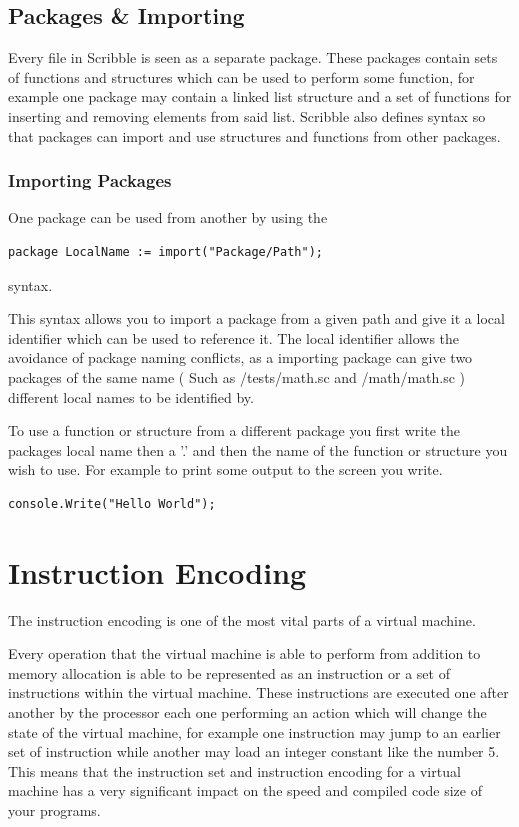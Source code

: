 \documentclass[]{final_report}
\begin{document}
\section{Packages \& Importing}

Every file in Scribble is seen as a separate package. These packages contain sets of functions and structures which can be used to perform some function, for example one package may contain a linked list structure and a set of functions for inserting and removing elements from said list. Scribble also defines syntax so that packages can import and use structures and functions from other packages.

\subsection{Importing Packages}

One package can be used from another by using the
\begin{verbatim}
package LocalName := import("Package/Path");
\end{verbatim}
syntax.

This syntax allows you to import a package from a given path and give it a local identifier which can be used to reference it. The local identifier allows the avoidance of package naming conflicts, as a importing package can give two packages of the same name ( Such as /tests/math.sc and /math/math.sc ) different local names to be identified by.

To use a function or structure from a different package you first write the packages local name then a '.' and then the name of the function or structure you wish to use. For example to print some output to the screen you write.

\begin{verbatim}
console.Write("Hello World");
\end{verbatim}

\chapter{Instruction Encoding}

The instruction encoding is one of the most vital parts of a virtual machine.

Every operation that the virtual machine is able to perform from addition to memory allocation is able to be represented as an instruction or a set of instructions within the virtual machine.
These instructions are executed one after another by the processor each one performing an action which will change the state of the virtual machine, for example one instruction may jump to an earlier set of instruction while another may load an integer constant like the number 5.
This means that the instruction set and instruction encoding for a virtual machine has a very significant impact on the speed and compiled code size of your programs.
\end{document}
